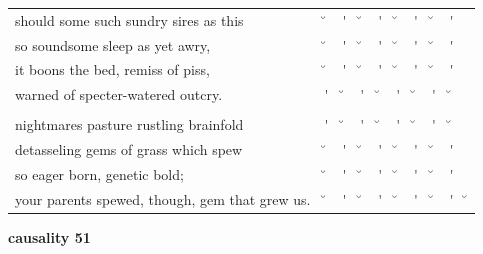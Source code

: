 \documentclass[12pt, landscape]{article}
\begin{document}
\begin{center}
\begin{tabularx}{\textwidth}{
>{\lefting\arraybackslash}X
c
c
c
c
c
c
c
c
c
}

should some such sundry sires as this & \u{} & \'{} & \u{} & \'{} & \u{} & \'{} & \u{} & \'{} & \\
so soundsome sleep as yet awry, & \u{} & \'{} & \u{} & \'{} & \u{} & \'{} & \u{} & \'{} & \\
it boons the bed, remiss of piss, & \u{} & \'{} & \u{} & \'{} & \u{} & \'{} & \u{} & \'{} & \\
warned of specter-watered outcry. & \'{} & \u{} & \'{} & \u{} & \'{} & \u{} & \'{} & \u{} & \\
 & & & & & & & & \\
nightmares pasture rustling brainfold & \'{} & \u{} & \'{} & \u{} & \'{} & \u{} & \'{} & \u{} & \\
detasseling gems of grass which spew & \u{} & \'{} & \u{} & \'{} & \u{} & \'{} & \u{} & \'{} & \\
so eager born, genetic bold; & \u{} & \'{} & \u{} & \'{} & \u{} & \'{} & \u{} & \'{} & \\
your parents spewed, though, gem that grew us. & \u{} & \'{} & \u{} & \'{} & \u{} & \'{} & \u{} & \'{} & \u{} \\

\end{tabularx}
\end{center}

\vspace*{\fill}

\newpage

\vspace*{\fill}

\noindent \textbf{causality 51}
\noindent \hfill \par
\end{document}
